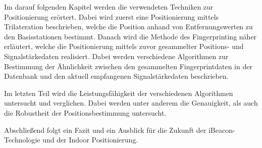 Im darauf folgenden Kapitel werden die verwendeten Techniken zur Positionierung erörtert. Dabei wird zuerst eine Positionierung mittels Trilateration beschrieben, welche die Position anhand von Entfernungswerten zu den Basisstationen bestimmt. Danach wird die Methode des Fingerprinting näher erläutert, welche die Positionierung mittels zuvor gesammelter Positions- und Signalstärkedaten realisiert. Dabei werden verschiedene Algorithmen zur Bestimmung der Ähnlichkeit zwischen den gesammelten Fingerprintdaten in der Datenbank und den aktuell empfangenen Signalstärkedaten beschrieben.

Im letzten Teil wird die Leistungsfähigkeit der verschiedenen Algorithmen untersucht und verglichen. Dabei werden unter anderem die Genauigkeit, als auch die Robustheit der Positionsbestimmung untersucht.

Abschließend folgt ein Fazit und ein Ausblick für die Zukunft der iBeacon-Technologie und der Indoor Positionierung.
